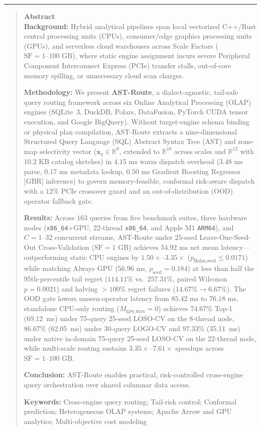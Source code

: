 \documentclass[10pt,a4paper]{article}
\begin{document}
\noindent\rule{\textwidth}{0.8pt}
\begin{quote}
\small\sffamily
\textbf{\color{springerblue}Abstract}\\[0.3em]
\textbf{Background:} Hybrid analytical pipelines span local vectorized C++/Rust central processing units (CPUs), consumer/edge graphics processing units (GPUs), and serverless cloud warehouses across Scale Factors ($\text{SF}=1\text{--}100\text{ GB}$), where static engine assignment incurs severe Peripheral Component Interconnect Express (PCIe) transfer stalls, out-of-core memory spilling, or unnecessary cloud scan charges.

\textbf{Methodology:} We present \textbf{AST-Route}, a dialect-agnostic, tail-safe query routing framework across six Online Analytical Processing (OLAP) engines (SQLite~3, DuckDB, Polars, DataFusion, PyTorch CUDA tensor execution, and Google BigQuery). Without target-engine schema binding or physical plan compilation, AST-Route extracts a nine-dimensional Structured Query Language (SQL) Abstract Syntax Tree (AST) and zone-map selectivity vector ($\mathbf{x}_q \in \mathbb{R}^{9}$, extended to $\mathbb{R}^{10}$ across scales and $\mathbb{R}^{12}$ with $10.2\text{ KB}$ catalog sketches) in $4.15\text{ ms}$ warm dispatch overhead ($3.48\text{ ms}$ parse, $0.17\text{ ms}$ metadata lookup, $0.50\text{ ms}$ Gradient Boosting Regressor [GBR] inference) to govern memory-feasible, conformal risk-aware dispatch with a $12\%$ PCIe crossover guard and an out-of-distribution (OOD) operator fallback gate.

\textbf{Results:} Across $163$ queries from five benchmark suites, three hardware nodes (\texttt{x86\_\allowbreak{}64}+GPU, 22-thread \texttt{x86\_\allowbreak{}64}, and Apple M1 \texttt{ARM64}), and $C=1\text{--}32$ concurrent streams, AST-Route under $25$-seed Leave-One-Seed-Out Cross-Validation ($\text{SF}=1\text{ GB}$) achieves $54.92\text{ ms}$ net mean latency---outperforming static CPU engines by $1.50\times\text{--}3.35\times$ ($p_{\text{Holm,seed}}\le 0.0171$) while matching Always GPU ($56.96\text{ ms}$, $p_{\text{seed}}=0.184$) at less than half the 95th-percentile tail regret ($114.11\%$ vs.\ $257.31\%$, paired Wilcoxon $p = 0.0021$) and halving $>100\%$ regret failures ($14.67\%\rightarrow 6.67\%$). The OOD gate lowers unseen-operator latency from $85.42\text{ ms}$ to $76.18\text{ ms}$, standalone CPU-only routing ($M_{\text{gpu\_max}}=0$) achieves 74.67\% Top-1 (69.12~ms) under 75-query 25-seed LOSO-CV on the 8-thread node, 86.67\% (62.05~ms) under 30-query LOGO-CV and 97.33\% (35.11~ms) under native in-domain 75-query 25-seed LOSO-CV on the 22-thread node, while multi-scale routing sustains $3.35\times\text{--}7.61\times$ speedups across $\text{SF}=1\text{--}100\text{ GB}$.

\textbf{Conclusion:} AST-Route enables practical, risk-controlled cross-engine query orchestration over shared columnar data access.

\noindent\textbf{Keywords:} Cross-engine query routing; Tail-risk control; Conformal prediction; Heterogeneous OLAP systems; Apache Arrow and GPU analytics; Multi-objective cost modeling
\end{quote}
\end{document}
